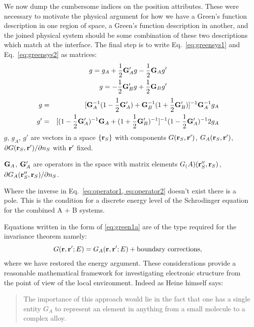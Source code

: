 We now dump the cumbersome indices on the position attributes. These
were necessary to motivate the physical argument for how we have a Green's function
description in one region of space, a Green's function description in another, 
and the joined physical system should be some combination of these two descriptions
which match at the interface. The final step is to write Eq.~\ref{eq:greensys1} 
and Eq.~\ref{eq:greensys2} as matrices:
%
\begin{align}
\label{eq:operator1}
g = g_{A} + \frac{1}{2}{\bf G}'_{A}g - \frac{1}{2}{\bf G}_{A}g' \\
g = -\frac{1}{2}{\bf G}'_{B}g + \frac{1}{2}{\bf G}_{B}g' \\
\end{align}
%
\begin{align}
\label{eq:operator2}
g & = & [{\bf G}^{-1}_{A}(1-\frac{1}{2}{\bf G}'_{A}) + {\bf G}^{-1}_{B}(1+\frac{1}{2}{\bf G}'_{B})]^{-1} {\bf G}^{-1}_{A}g_{A} \\
g' & = & [(1-\frac{1}{2}{\bf G}'_{A})^{-1}{\bf G}_{A} + (1+\frac{1}{2}{\bf G}'_{B})^{-1}]^{-1}(1 - \frac{1}{2}{\bf G}'_{A})^{-1}2g_{A}
\end{align}
%
$g$, $g_{A}$, $g'$ are vectors in a space $\{{\bf r}_{S}\}$ with components $G({\bf r}_{S},{\bf r}')$,
$G_{A}({\bf r}_{S},{\bf r}')$, $\partial G({\bf r}_{S},{\bf r}')/\partial n_{S}$ with ${\bf r}'$ fixed.

${\bf G}_{A}$, ${\bf G}'_{A}$ are operators in the space with matrix elements
$G_(A)({\bf r}''_{S}, {\bf r}_{S})$, $\partial G_{A}({\bf r}''_{S}, {\bf r}_{S})/\partial n_{S}$.

Where the inverse in Eq.~\ref{eq:operator1, eq:operator2} 
doesn't exist there is a pole. This is the condition for a discrete energy level 
of the Schrodinger equation for the combined A + B systems. 

Equations written in the form of \ref{eq:green1a} are of the type required for the invariance theorem namely:
%
\begin{equation}
G({\bf r},{\bf r}';E) = G_{A}({\bf r},{\bf r}';E) + {\rm boundary ~ corrections},
\end{equation}
%
where we have restored the energy argument.
These considerations provide a reasonable mathematical framework for 
investigating electronic structure from the point of view of the local environment.
Indeed as Heine himself says: 

\begin{quote}
The importance of this approach would lie in the fact that
one has a single entity $G_{A}$ to represent an element in anything 
from a small molecule to a complex alloy.
\end{quote}

